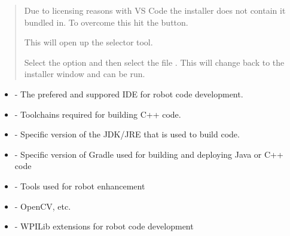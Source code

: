 \documentclass[letterpaper,10pt,english]{sphinxmanual}
\begin{document}
\begin{quote}

Due to licensing reasons with VS Code the installer does not contain it bundled in. To overcome this hit the  button.


This will open up the selector tool.


Select the  option and then select the file . This will change back to the installer window and  can be run.

\end{quote}

\begin{itemize}
\item {} 
 - The prefered and suppored IDE for robot code development.

\item {} 
 - Toolchains required for building C++ code.

\item {} 
 - Specific version of the JDK/JRE that is used to build code.

\item {} 
 - Specific version of Gradle used for building and deploying Java or C++ code

\item {} 
 - Tools used for robot enhancement

\item {} 
 - OpenCV, etc.

\item {} 
 - WPILib extensions for robot code development

\end{itemize}
\end{document}
